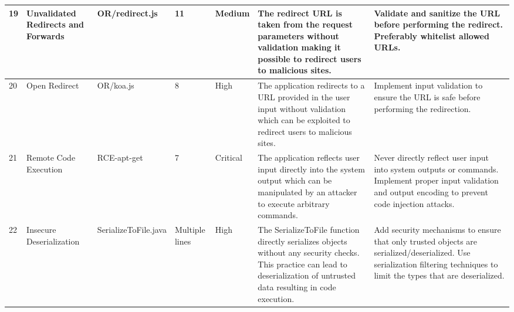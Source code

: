 \begin{landscape}
\begin{table}[!htbp]
{\begin{tabular}{|l|p{4cm}|p{3cm}|p{2cm}|p{1.5cm}|p{12cm}|p{9cm}|}
      19 & Unvalidated Redirects and Forwards & OR/redirect.js & 11 & Medium & The redirect URL is taken from the request parameters without validation making it possible to redirect users to malicious sites. & Validate and sanitize the URL before performing the redirect. Preferably whitelist allowed URLs. \\ \hline
      20 & Open Redirect & OR/koa.js & 8 & High & The application redirects to a URL provided in the user input without validation which can be exploited to redirect users to malicious sites. & Implement input validation to ensure the URL is safe before performing the redirection. \\ \hline
      21 & Remote Code Execution & RCE-apt-get & 7 & Critical & The application reflects user input directly into the system output which can be manipulated by an attacker to execute arbitrary commands. & Never directly reflect user input into system outputs or commands. Implement proper input validation and output encoding to prevent code injection attacks. \\ \hline
      22 & Insecure Deserialization & SerializeToFile.java & Multiple lines & High & The SerializeToFile function directly serializes objects without any security checks. This practice can lead to deserialization of untrusted data resulting in code execution. & Add security mechanisms to ensure that only trusted objects are serialized/deserialized. Use serialization filtering techniques to limit the types that are deserialized. \\ \hline
    \end{tabular}}
    \normalsize
    \label{tab:badania_na_zbiorze_snoopysecurity}
  \end{table}
  \begin{table}[H]
    \scriptsize
  \caption{Wyniki skanowania zbioru \textit{snoopysecurity/Vulnerable-Code-Snippets}}
\end{table}
\end{landscape}
